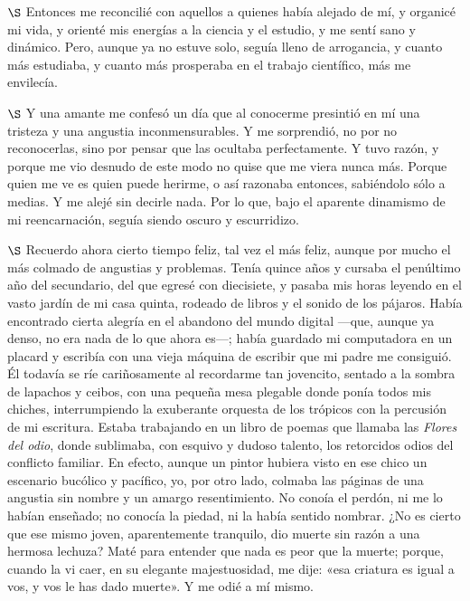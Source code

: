 \documentclass[a4paper, 12pt]{article}
\begin{document}
$\S$ Entonces me reconcilié con aquellos a quienes había alejado de mí, y
organicé mi vida, y orienté mis energías a la ciencia y el estudio, y me sentí
sano y dinámico. Pero, aunque ya no estuve solo, seguía lleno de arrogancia, y
cuanto más estudiaba, y cuanto más prosperaba en el trabajo científico, más me
envilecía.

$\S$ Y una amante me confesó un día que al conocerme presintió en mí una
tristeza y una angustia inconmensurables. Y me sorprendió, no por no
reconocerlas, sino por pensar que las ocultaba perfectamente. Y tuvo razón, y
porque me vio desnudo de este modo no quise que me viera nunca más. Porque quien
me ve es quien puede herirme, o así razonaba entonces, sabiéndolo sólo a medias.
Y me alejé sin decirle nada. Por lo que, bajo el aparente dinamismo de mi
reencarnación, seguía siendo oscuro y escurridizo.

$\S$ Recuerdo ahora cierto tiempo feliz, tal vez el más feliz, aunque por mucho
el más colmado de angustias y problemas. Tenía quince años y cursaba el
penúltimo año del secundario, del que egresé con diecisiete, y pasaba mis horas
leyendo en el vasto jardín de mi casa quinta, rodeado de libros y el sonido de
los pájaros. Había encontrado cierta alegría en el abandono del mundo digital
---que, aunque ya denso, no era nada de lo que ahora es---; había guardado mi
computadora en un placard y escribía con una vieja máquina de escribir que mi
padre me consiguió. Él todavía se ríe cariñosamente al recordarme tan jovencito,
sentado a la sombra de lapachos y ceibos, con una pequeña mesa plegable donde
ponía todos mis chiches, interrumpiendo la exuberante orquesta de los trópicos
con la percusión de mi escritura. Estaba trabajando en un libro de poemas que
llamaba las \textit{Flores del odio}, donde sublimaba, con esquivo y dudoso
talento, los retorcidos odios del conflicto familiar. En efecto, aunque un
pintor hubiera visto en ese chico un escenario bucólico y pacífico, yo, por otro
lado, colmaba las páginas de una angustia sin nombre y un amargo resentimiento.
No conoía el perdón, ni me lo habían enseñado; no conocía la piedad, ni la había
sentido nombrar. ¿No es cierto que ese mismo joven, aparentemente tranquilo,
dio muerte sin razón a una hermosa lechuza? Maté para entender que nada es peor
que la muerte; porque, cuando la vi caer, en su elegante majestuosidad, me dije:
«esa criatura es igual a vos, y vos le has dado muerte». Y me odié a mí mismo.
\end{document}
